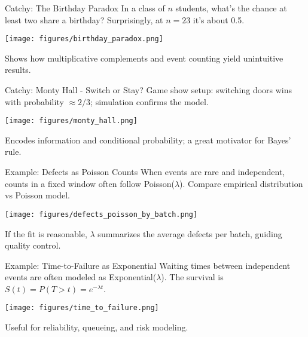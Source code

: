 \documentclass{beamer}
\def\textemdash{-}%
\def\P{P}%
\def\mathbb#1{#1}%
\renewcommand{\P}{\mathbb{P}}
\newcommand{\1}{\mathbf{1}}
\begin{document}
\begin{frame}{Catchy: The Birthday Paradox}
  In a class of $n$ students, what's the chance at least two share a birthday? Surprisingly, at $n=23$ it's about 0.5.
  \begin{center}
    \texttt{[image: figures/birthday\_paradox.png]}
  \end{center}
  {\small Shows how multiplicative complements and event counting yield unintuitive results.}
\end{frame}

\begin{frame}{Catchy: Monty Hall \textemdash{} Switch or Stay?}
  Game show setup: switching doors wins with probability $\approx 2/3$; simulation confirms the model.
  \begin{center}
    \texttt{[image: figures/monty\_hall.png]}
  \end{center}
  {\small Encodes information and conditional probability; a great motivator for Bayes' rule.}
\end{frame}

\begin{frame}{Example: Defects as Poisson Counts}
  When events are rare and independent, counts in a fixed window often follow Poisson($\lambda$). Compare empirical distribution vs Poisson model.
  \begin{center}
    \texttt{[image: figures/defects\_poisson\_by\_batch.png]}
  \end{center}
  {\small If the fit is reasonable, $\lambda$ summarizes the average defects per batch, guiding quality control.}
\end{frame}

\begin{frame}{Example: Time-to-Failure as Exponential}
  Waiting times between independent events are often modeled as Exponential($\lambda$). The survival is $S(t)=\P(T>t)=e^{-\lambda t}$.
  \begin{center}
    \texttt{[image: figures/time\_to\_failure.png]}
  \end{center}
  {\small Useful for reliability, queueing, and risk modeling.}
\end{frame}
\end{document}
